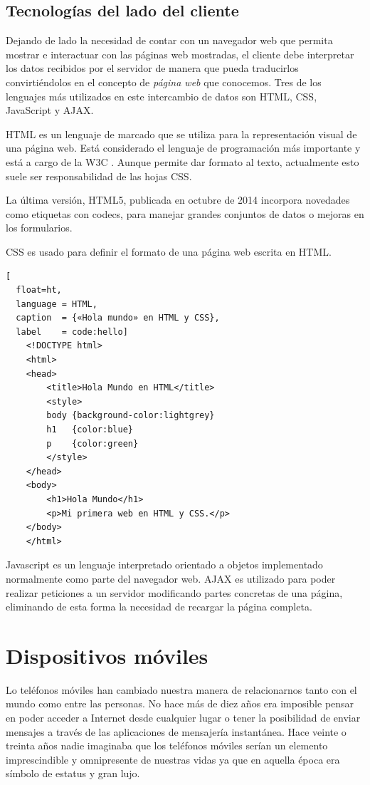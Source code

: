 \subsection{Tecnologías del lado del cliente}
Dejando de lado la necesidad de contar con un navegador web que permita mostrar e interactuar con las páginas web mostradas, el cliente debe interpretar los datos recibidos por el servidor de manera que pueda traducirlos convirtiéndolos en el concepto de \textit{página web} que conocemos. Tres de los lenguajes más utilizados en este intercambio de datos son \ac{HTML}, \ac{CSS}, JavaScript y \ac{AJAX}.

\ac{HTML} es un lenguaje de marcado que se utiliza para la representación visual de una página web. Está considerado el lenguaje de programación más importante y está a cargo de la W3C \cite{Worl15}. Aunque permite dar formato al texto, actualmente esto suele ser responsabilidad de las hojas \ac{CSS}.

La última versión, \ac{HTML}5, publicada en octubre de 2014 \cite{Adam14} incorpora novedades como etiquetas con codecs, para manejar grandes conjuntos de datos o mejoras en los formularios.

\ac{CSS} es usado para definir el formato de una página web escrita en \ac{HTML}.

\begin{lstlisting}[
  float=ht,
  language = HTML,
  caption  = {«Hola mundo» en HTML y CSS},
  label    = code:hello]
	<!DOCTYPE html>
	<html>
	<head>
	    <title>Hola Mundo en HTML</title>
		<style>
		body {background-color:lightgrey}
		h1   {color:blue}
		p    {color:green}
		</style>
	</head>
	<body>
		<h1>Hola Mundo</h1>
		<p>Mi primera web en HTML y CSS.</p>
	</body>
	</html>
\end{lstlisting}

Javascript es un lenguaje interpretado orientado a objetos implementado normalmente como parte del navegador web.
\ac{AJAX} es utilizado para poder realizar peticiones a un servidor modificando partes concretas de una página, eliminando de esta forma la necesidad de recargar la página completa.



\section{Dispositivos móviles}
Lo teléfonos móviles han cambiado nuestra manera de relacionarnos tanto con el mundo como entre las personas. No hace más de diez años era imposible pensar en poder acceder a Internet desde cualquier lugar o tener la posibilidad de enviar mensajes a través de 
las aplicaciones de mensajería instantánea. Hace veinte o treinta años nadie imaginaba que los teléfonos móviles serían un elemento imprescindible y omnipresente de nuestras vidas ya que en aquella época era símbolo de estatus y gran lujo.

